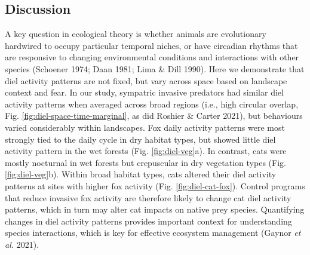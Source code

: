 \documentclass[11pt,a4paper,titlepage,twoside,openright]{style/unimelbthesis}
\begin{document}
\begin{mainmatter}
\hypertarget{discussion-3}{%
\section{Discussion}\label{discussion-3}}

A key question in ecological theory is whether animals are evolutionary hardwired to occupy particular temporal niches, or have circadian rhythms that are responsive to changing environmental conditions and interactions with other species (Schoener 1974; Daan 1981; Lima \& Dill 1990). Here we demonstrate that diel activity patterns are not fixed, but vary across space based on landscape context and fear. In our study, sympatric invasive predators had similar diel activity patterns when averaged across broad regions (i.e., high circular overlap, Fig. \ref{fig:diel-space-time-marginal}, as did Roshier \& Carter 2021), but behaviours varied considerably within landscapes. Fox daily activity patterns were most strongly tied to the daily cycle in dry habitat types, but showed little diel activity pattern in the wet forests (Fig. \ref{fig:diel-veg}a). In contrast, cats were mostly nocturnal in wet forests but crepuscular in dry vegetation types (Fig. \ref{fig:diel-veg}b). Within broad habitat types, cats altered their diel activity patterns at sites with higher fox activity (Fig. \ref{fig:diel-cat-fox}). Control programs that reduce invasive fox activity are therefore likely to change cat diel activity patterns, which in turn may alter cat impacts on native prey species. Quantifying changes in diel activity patterns provides important context for understanding species interactions, which is key for effective ecosystem management (Gaynor \emph{et al.} 2021).


\end{mainmatter}
\end{document}

